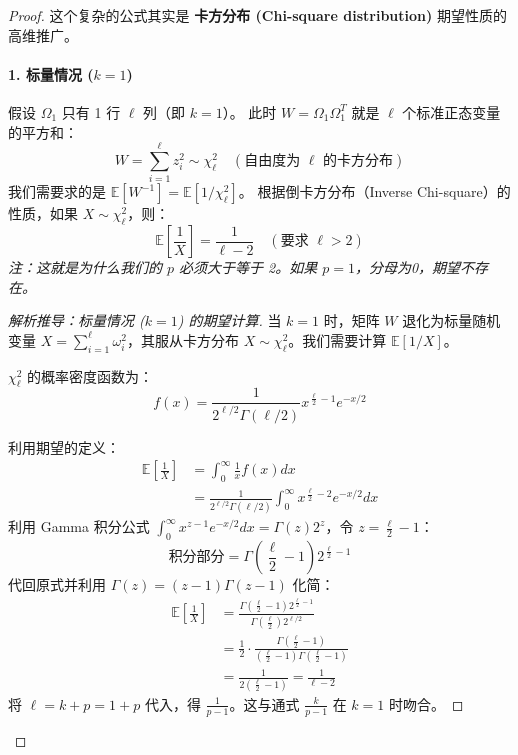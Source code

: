 \documentclass[11pt,a4paper]{ctexart}
\theoremstyle{definition}
\theoremstyle{remark}
\begin{document}
\begin{proof}
这个复杂的公式其实是 \textbf{卡方分布 (Chi-square distribution)} 期望性质的高维推广。

\paragraph{1. 标量情况 ($k=1$)}
假设 $\Omega_1$ 只有 1 行 $\ell$ 列（即 $k=1$）。
此时 $W = \Omega_1 \Omega_1^T$ 就是 $\ell$ 个标准正态变量的平方和：
\[
W = \sum_{i=1}^\ell z_i^2 \sim \chi^2_\ell \quad (\text{自由度为 } \ell \text{ 的卡方分布})
\]
我们需要求的是 $\mathbb{E}[W^{-1}] = \mathbb{E}[1/\chi^2_\ell]$。
根据倒卡方分布（Inverse Chi-square）的性质，如果 $X \sim \chi^2_\ell$，则：
\[
\mathbb{E}\left[\frac{1}{X}\right] = \frac{1}{\ell - 2} \quad (\text{要求 } \ell > 2)
\]
\textit{注：这就是为什么我们的 $p$ 必须大于等于 2。如果 $p=1$，分母为0，期望不存在。}


\begin{proof}[解析推导：标量情况 ($k=1$) 的期望计算]
当 $k=1$ 时，矩阵 $W$ 退化为标量随机变量 $X = \sum_{i=1}^\ell \omega_i^2$，其服从卡方分布 $X \sim \chi^2_\ell$。我们需要计算 $\mathbb{E}[1/X]$。

$\chi^2_\ell$ 的概率密度函数为：
\[ f(x) = \frac{1}{2^{\ell/2} \Gamma(\ell/2)} x^{\frac{\ell}{2}-1} e^{-x/2} \]

利用期望的定义：
\[
\begin{aligned}
\mathbb{E}\left[\frac{1}{X}\right] &= \int_0^\infty \frac{1}{x} f(x) dx \\
&= \frac{1}{2^{\ell/2} \Gamma(\ell/2)} \int_0^\infty x^{\frac{\ell}{2}-2} e^{-x/2} dx
\end{aligned}
\]
利用 Gamma 积分公式 $\int_0^\infty x^{z-1}e^{-x/2}dx = \Gamma(z) 2^z$，令 $z = \frac{\ell}{2}-1$：
\[
\text{积分部分} = \Gamma\left(\frac{\ell}{2}-1\right) 2^{\frac{\ell}{2}-1}
\]
代回原式并利用 $\Gamma(z) = (z-1)\Gamma(z-1)$ 化简：
\[
\begin{aligned}
\mathbb{E}\left[\frac{1}{X}\right] &= \frac{\Gamma(\frac{\ell}{2}-1) 2^{\frac{\ell}{2}-1}}{\Gamma(\frac{\ell}{2}) 2^{\ell/2}} \\
&= \frac{1}{2} \cdot \frac{\Gamma(\frac{\ell}{2}-1)}{(\frac{\ell}{2}-1)\Gamma(\frac{\ell}{2}-1)} \\
&= \frac{1}{2(\frac{\ell}{2}-1)} = \frac{1}{\ell - 2}
\end{aligned}
\]
将 $\ell = k+p = 1+p$ 代入，得 $\frac{1}{p-1}$。这与通式 $\frac{k}{p-1}$ 在 $k=1$ 时吻合。
\end{proof}


\end{proof}
\end{document}
